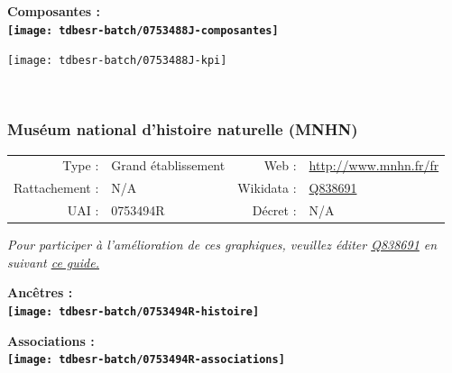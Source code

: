 \documentclass[12pt,french,]{article}
\begin{document}
\hrulefill

\begin{center} \bf Composantes : \\  
\texttt{[image: tdbesr-batch/0753488J-composantes]} \end{center}

\begin{center}\texttt{[image: tdbesr-batch/0753488J-kpi]} \end{center}\checkoddpage

\ifoddpage \fi ~\newpage  

\hypertarget{musuxe9um-national-dhistoire-naturelle-mnhn}{%
\subsubsection{Muséum national d'histoire naturelle
(MNHN)}\label{musuxe9um-national-dhistoire-naturelle-mnhn}}

\begin{tabular*}{\textwidth}{rp{5cm}rl}  
\hline  
Type : & Grand établissement & Web : &\href{http://www.mnhn.fr/fr}{http://www.mnhn.fr/fr} \\  
Rattachement : & N/A & Wikidata : & \href{https://www.wikidata.org/entity/Q838691}{Q838691} \\  
UAI : & 0753494R & Décret : & N/A \\  
\hline  
\end{tabular*}

\textit{\scriptsize Pour participer à l'amélioration de ces graphiques, veuillez éditer  \href{https://www.wikidata.org/entity/Q838691}{Q838691}  en suivant \href{https://github.com/cpesr/wikidataESR/blob/master/Rmd/wikidataESR.md}{ce guide.}}

\vspace{1cm}  
\begin{minipage}[b]{0.50\textwidth}\begin{center} \bf Ancêtres : \\  
\texttt{[image: tdbesr-batch/0753494R-histoire]} \end{center}\end{minipage}\begin{minipage}[b]{0.50\textwidth}\begin{center} \bf Associations : \\  
\texttt{[image: tdbesr-batch/0753494R-associations]} \end{center}\end{minipage}

\hrulefill
\end{document}
